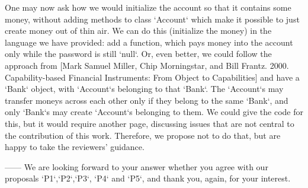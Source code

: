 \documentclass[11pt]{amsart}
\begin{document}
One may now ask how we would initialize the account so that it contains some money, 
without adding methods to class `Account` which make it possible to just create money
out of thin air. We can do this (initialize the money) in the language we have
provided: add a function, which pays money into the account only while the password 
is still `null`. Or, even better, we could follow the approach  from [Mark Samuel Miller, 
Chip Morningstar, and Bill Frantz. 2000. Capability-based Financial Instruments: 
From Object to Capabilities] and have a `Bank` object, with `Account`s belonging 
to that `Bank`. The `Account`s may transfer moneys across 
each other only if they belong to the same `Bank`, and only `Bank`s may create `Account`s 
belonging to them. We could give the code for this, but it would require another page, 
discussing issues that are not central to the contribution of this work. Therefore,
we propose not to do that, but are happy to take the reviewers' guidance.

------
We are looking forward to your answer whether you agree with our proposals `P1`,`P2`,`P3`, `P4` and `P5`, and thank you, again, for your interest.
 




 
\end{document}
